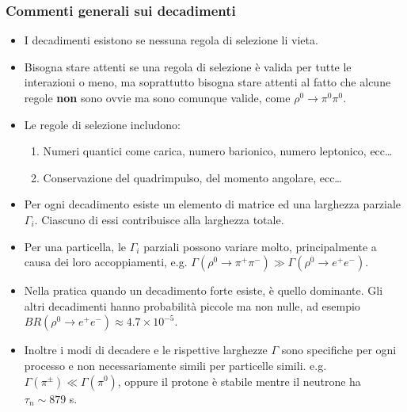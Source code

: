 \subsubsection{Commenti generali sui decadimenti}
\begin{itemize}
\item I decadimenti esistono se nessuna regola di selezione li vieta.
\item Bisogna stare attenti se una regola di selezione è valida per tutte le interazioni o meno, ma soprattutto bisogna stare attenti al fatto che alcune regole \textbf{non} sono ovvie ma sono comunque valide, come $\rho^0\to\pi^0\pi^0$.
\item Le regole di selezione includono:
\begin{enumerate}
\item Numeri quantici come carica, numero barionico, numero leptonico, ecc\dots
\item Conservazione del quadrimpulso, del momento angolare, ecc\dots
\end{enumerate}
\item Per ogni decadimento esiste un elemento di matrice ed una larghezza parziale $\Gamma_i$. Ciascuno di essi contribuisce alla larghezza totale.
\item Per una particella, le $\Gamma_i$ parziali possono variare molto, principalmente a causa dei loro accoppiamenti, e.g. $\Gamma(\rho^0\to\pi^+\pi^-)\gg\Gamma(\rho^0\to e^+e^-)$.
\item Nella pratica quando un decadimento forte esiste, è quello dominante. Gli altri decadimenti hanno probabilità piccole ma non nulle, ad esempio $BR(\rho^0\to e^+e^-)\approx4.7\times10^{-5}$.
\item Inoltre i modi di decadere e le rispettive larghezze $\Gamma$ sono specifiche per ogni processo e non necessariamente simili per particelle simili. e.g. $\Gamma(\pi^\pm)\ll \Gamma(\pi^0)$, oppure il protone è stabile mentre il neutrone ha $\tau_n\sim879$ s.
\end{itemize}
